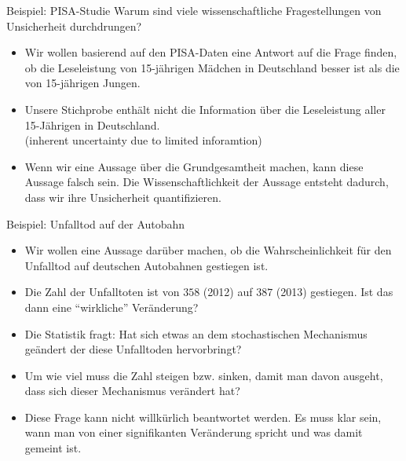 \documentclass[usenames,dvipsnames,handout]{beamer}
\begin{document}
\begin{frame}{ Beispiel: PISA-Studie }%
Warum sind viele wissenschaftliche Fragestellungen von Unsicherheit durchdrungen?
\begin{itemize}
\item{Wir wollen basierend auf den PISA-Daten  eine Antwort auf die Frage finden, ob die Leseleistung von 15-jährigen  Mädchen
in Deutschland besser ist als die von 15-jährigen  Jungen.}\pause
\item{Unsere Stichprobe enthält nicht die Information über die Leseleistung aller 15-Jährigen in Deutschland.\\
(inherent uncertainty due to limited inforamtion) }\pause
\item{Wenn wir eine Aussage über die Grundgesamtheit machen,
kann diese Aussage falsch sein. Die Wissenschaftlichkeit der Aussage entsteht dadurch, dass wir ihre Unsicherheit quantifizieren. }
\end{itemize}
\end{frame}
\begin{frame}{ Beispiel: Unfalltod  auf der Autobahn}
\begin{itemize}
\item{Wir wollen eine Aussage darüber machen, ob die Wahrscheinlichkeit für den Unfalltod auf deutschen Autobahnen gestiegen ist.}\pause
\item{ Die Zahl der Unfalltoten ist von \colorbox{yellow!40}{$358$} (2012) auf \colorbox{yellow!40}{$387$}
 (2013) gestiegen. 
Ist das dann eine ``wirkliche'' Veränderung? }\pause
\item{Die Statistik fragt: Hat sich etwas an dem stochastischen Mechanismus geändert der diese Unfalltoden hervorbringt?}\pause
\item{Um wie viel muss die Zahl steigen bzw. sinken, damit man davon ausgeht, dass sich dieser Mechanismus verändert hat?}\pause
\item{Diese Frage kann nicht willkürlich beantwortet werden. Es muss klar sein, wann man von einer signifikanten Veränderung spricht und was damit gemeint ist.}
\end{itemize}
\end{frame}
\end{document}
